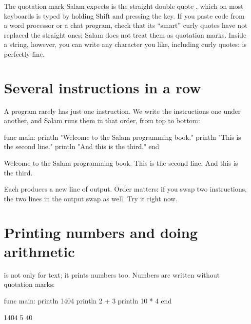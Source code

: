 \begin{tip}
The quotation mark Salam expects is the straight double quote ,
which on most keyboards is typed by holding Shift and pressing the 
key. If you paste code from a word processor or a chat program, check that
its ``smart'' curly quotes have not replaced the straight ones; Salam does not
treat them as quotation marks. Inside a string, however, you can write any
character you like, including curly quotes:  is perfectly fine.
\end{tip}

\section{Several instructions in a row}

A program rarely has just one instruction. We write the instructions one
under another, and Salam runs them in that order, from top to bottom:

\begin{salamcode}
func main:
    println "Welcome to the Salam programming book."
    println "This is the second line."
    println "And this is the third."
end
\end{salamcode}

\begin{salamout}
Welcome to the Salam programming book.
This is the second line.
And this is the third.
\end{salamout}

Each  produces a new line of output. Order matters: if you swap
two instructions, the two lines in the output swap as well. Try it right now.

\section{Printing numbers and doing arithmetic}

 is not only for text; it prints numbers too. Numbers are
written without quotation marks:

\begin{salamcode}
func main:
    println 1404
    println 2 + 3
    println 10 * 4
end
\end{salamcode}

\begin{salamout}
1404
5
40
\end{salamout}

